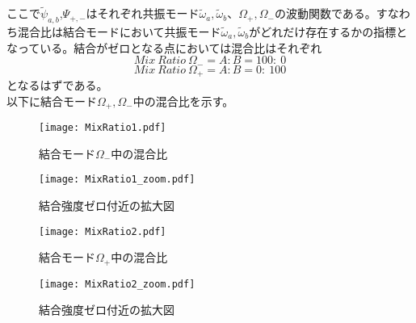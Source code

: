 ここで$\tilde{\psi}_{a,b}$,$\Psi_{+,-}$はそれぞれ共振モード$\tilde{\omega}_a,\tilde{\omega}_b$、$\Omega_{+},\Omega_{-}$の波動関数である。すなわち混合比は結合モードにおいて共振モード$\tilde{\omega}_a,\tilde{\omega}_b$がどれだけ存在するかの指標となっている。結合がゼロとなる点においては混合比はそれぞれ
\begin{equation}
    Mix\ Ratio\ \Omega_{-} = A:B  = 100: \  0
\end{equation}
\begin{equation}
    Mix\ Ratio\ \Omega_{+} = A:B  = 0: \  100
\end{equation}
となるはずである。\\
以下に結合モード$\Omega_{+},\Omega_{-}$中の混合比を示す。
\begin{figure}[H]
    \begin{minipage}[t]{0.5\columnwidth}
        \centering
        \texttt{[image: MixRatio1.pdf]}
        \caption{結合モード$\Omega_{-}$中の混合比}
    \end{minipage}%
    \begin{minipage}[t]{0.5\columnwidth}
        \centering
        \texttt{[image: MixRatio1\_zoom.pdf]}
        \caption{結合強度ゼロ付近の拡大図}
    \end{minipage}
\end{figure}
\begin{figure}[H]
    \begin{minipage}[t]{0.5\columnwidth}
        \centering
        \texttt{[image: MixRatio2.pdf]}
        \caption{結合モード$\Omega_{+}$中の混合比}
    \end{minipage}%
    \begin{minipage}[t]{0.5\columnwidth}
        \centering
        \texttt{[image: MixRatio2\_zoom.pdf]}
        \caption{結合強度ゼロ付近の拡大図}
    \end{minipage}
\end{figure}